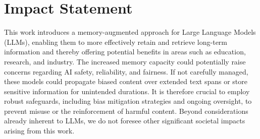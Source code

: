 \section*{Impact Statement}
This work introduces a memory-augmented approach for Large Language Models (LLMs), enabling them to more effectively retain and retrieve long-term information and thereby offering potential benefits in areas such as education, research, and industry. The increased memory capacity could potentially raise concerns regarding AI safety, reliability, and fairness. If not carefully managed, these models could propagate biased content over extended text spans or store sensitive information for unintended durations. It is therefore crucial to employ robust safeguards, including bias mitigation strategies and ongoing oversight, to prevent misuse or the reinforcement of harmful content. Beyond considerations already inherent to LLMs, we do not foresee other significant societal impacts arising from this work.